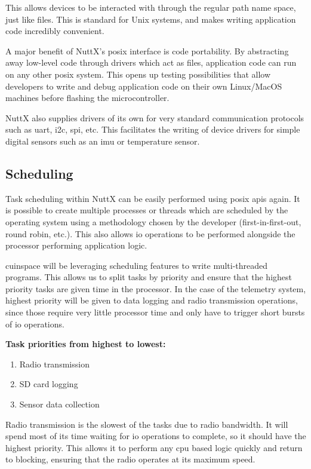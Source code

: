 This allows devices to be interacted with through the regular path name space, just like files. This is standard for
Unix systems, and makes writing application code incredibly convenient.

A major benefit of NuttX's \gls{posix} interface is code portability. By abstracting away low-level code through
drivers which act as files, application code can run on any other \gls{posix} system. This opens up testing
possibilities that allow developers to write and debug application code on their own Linux/MacOS machines before
flashing the microcontroller.

NuttX also supplies drivers of its own for very standard communication protocols such as \gls{uart}, \gls{i2c},
\gls{spi}, etc. This facilitates the writing of device drivers for simple digital sensors such as an \gls{imu} or
temperature sensor.

\subsection{Scheduling}

Task scheduling within NuttX can be easily performed using \gls{posix} \glspl{api} again. It is possible to create
multiple processes or threads which are scheduled by the operating system using a methodology chosen by the developer
(first-in-first-out, round robin, etc.). This also allows \gls{io} operations to be performed alongside the processor
performing application logic.

\Gls{cuinspace} will be leveraging scheduling features to write multi-threaded programs. This allows us to split tasks
by priority and ensure that the highest priority tasks are given time in the processor. In the case of the telemetry
system, highest priority will be given to data logging and radio transmission operations, since those require very
little processor time and only have to trigger short bursts of \gls{io} operations.

\textbf{Task priorities from highest to lowest:}

\begin{enumerate}
    \item Radio transmission
    \item SD card logging
    \item Sensor data collection
\end{enumerate}

Radio transmission is the slowest of the tasks due to radio bandwidth. It will spend most of its time waiting for
\gls{io} operations to complete, so it should have the highest priority. This allows it to perform any \gls{cpu} based
logic quickly and return to blocking, ensuring that the radio operates at its maximum speed.

